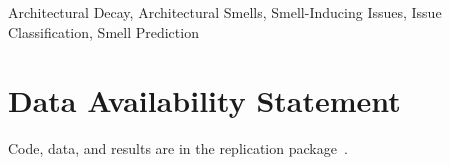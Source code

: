 \documentclass[conference]{IEEEtran}
\begin{document}
\begin{IEEEkeywords}
Architectural Decay, Architectural Smells, Smell-Inducing Issues, Issue Classification, Smell Prediction
\end{IEEEkeywords}










\appendix



\section*{Data Availability Statement}
Code, data, and results are in the replication package~\cite{replication}.




\end{document}
